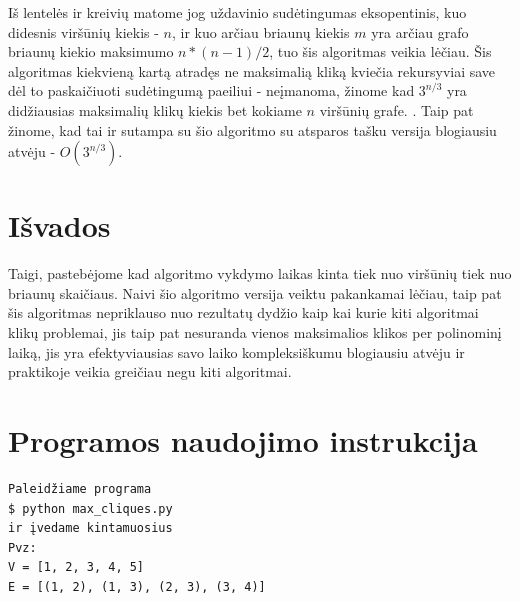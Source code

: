 \documentclass{VUMIFInfKursinis}
\begin{document}
\begin{figure}[H]
\centering
{}
\end{figure}
Iš lentelės ir kreivių matome jog uždavinio sudėtingumas eksopentinis, kuo didesnis viršūnių kiekis - $n$, ir kuo arčiau briaunų kiekis $m$ yra arčiau grafo briaunų kiekio maksimumo $n * (n-1) / 2$, tuo šis algoritmas veikia lėčiau. Šis algoritmas kiekvieną kartą atradęs ne maksimalią kliką kviečia rekursyviai save dėl to paskaičiuoti sudėtingumą paeiliui - neįmanoma, žinome kad $3^{n/3}$ yra didžiausias maksimalių klikų kiekis bet kokiame $n$ viršūnių grafe. \cite{Moon1965OnCI}. Taip pat žinome, kad tai ir sutampa su šio algoritmo su atsparos tašku versija blogiausiu atvėju - $O(3^{n/3})$. \cite{Tomita2006TheWT}

\section{Išvados}
Taigi, pastebėjome kad algoritmo vykdymo laikas kinta tiek nuo viršūnių tiek nuo briaunų skaičiaus. Naivi šio algoritmo versija veiktu pakankamai lėčiau, taip pat šis algoritmas nepriklauso nuo rezultatų dydžio kaip kai kurie kiti algoritmai klikų problemai, jis taip pat nesuranda vienos maksimalios klikos per polinominį laiką, jis yra efektyviausias savo laiko kompleksiškumu blogiausiu atvėju ir praktikoje veikia greičiau negu kiti algoritmai.

\section{Programos naudojimo instrukcija}
\begin{verbatim}
Paleidžiame programa
$ python max_cliques.py
ir įvedame kintamuosius
Pvz: 
V = [1, 2, 3, 4, 5]
E = [(1, 2), (1, 3), (2, 3), (3, 4)]
\end{verbatim}

\printbibliography[heading=bibintoc] %

\end{document}
